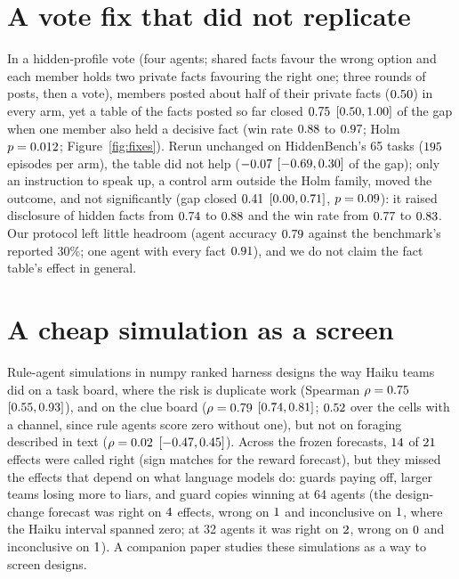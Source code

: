 \documentclass{article}
\begin{document}
\section{A vote fix that did not replicate}
\label{sec:vote}
In a hidden-profile vote (four agents; shared facts favour the wrong option and each member holds two private facts favouring the right one; three rounds of posts, then a vote), members posted about half of their private facts ($0.50$) in every arm, yet a table of the facts posted so far closed $0.75$ $[0.50, 1.00]$ of the gap when one member also held a decisive fact (win rate $0.88$ to $0.97$; Holm $p = 0.012$; Figure~\ref{fig:fixes}). Rerun unchanged on HiddenBench's 65 tasks \citep{li2026hiddenbench} ($195$ episodes per arm), the table did not help ($-0.07$ $[-0.69, 0.30]$ of the gap); only an instruction to speak up, a control arm outside the Holm family, moved the outcome, and not significantly (gap closed $0.41$ $[0.00, 0.71]$, $p = 0.09$): it raised disclosure of hidden facts from $0.74$ to $0.88$ and the win rate from $0.77$ to $0.83$. Our protocol left little headroom (agent accuracy $0.79$ against the benchmark's reported 30\%; one agent with every fact $0.91$), and we do not claim the fact table's effect in general.

\section{A cheap simulation as a screen}
\label{app:sim}
Rule-agent simulations in numpy ranked harness designs the way Haiku teams did on a task board, where the risk is duplicate work (Spearman $\rho = 0.75$ $[0.55, 0.93]$), and on the clue board ($\rho = 0.79$ $[0.74, 0.81]$; $0.52$ over the cells with a channel, since rule agents score zero without one), but not on foraging described in text ($\rho = 0.02$ $[-0.47, 0.45]$). Across the frozen forecasts, $14$ of $21$ effects were called right (sign matches for the reward forecast), but they missed the effects that depend on what language models do: guards paying off, larger teams losing more to liars, and guard copies winning at 64 agents (the design-change forecast was right on $4$ effects, wrong on $1$ and inconclusive on $1$, where the Haiku interval spanned zero; at 32 agents it was right on $2$, wrong on $0$ and inconclusive on $1$). A companion paper studies these simulations as a way to screen designs.
\end{document}

